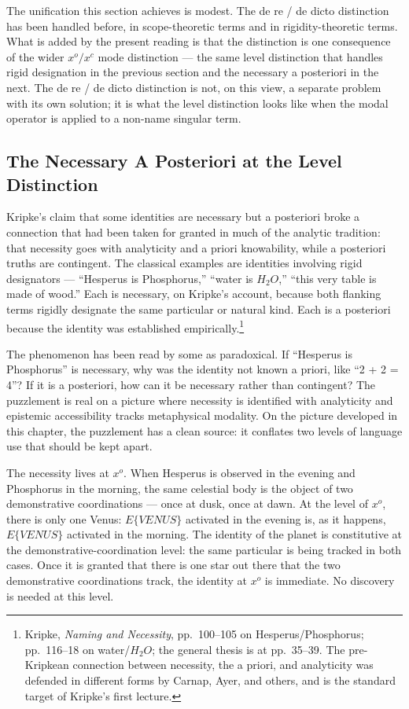 \documentclass[12pt,a4paper]{article}
\begin{document}
The unification this section achieves is modest. The de re / de dicto distinction has been handled before, in scope-theoretic terms and in rigidity-theoretic terms. What is added by the present reading is that the distinction is one consequence of the wider \(x^o/x^c\) mode distinction --- the same level distinction that handles rigid designation in the previous section and the necessary a posteriori in the next. The de re / de dicto distinction is not, on this view, a separate problem with its own solution; it is what the level distinction looks like when the modal operator is applied to a non-name singular term.

\subsection{The Necessary A Posteriori at the Level Distinction}\label{the-necessary-a-posteriori-at-the-level-distinction}

Kripke's claim that some identities are necessary but a posteriori broke a connection that had been taken for granted in much of the analytic tradition: that necessity goes with analyticity and a priori knowability, while a posteriori truths are contingent. The classical examples are identities involving rigid designators --- ``Hesperus is Phosphorus,'' ``water is \(H_2O\),'' ``this very table is made of wood.'' Each is necessary, on Kripke's account, because both flanking terms rigidly designate the same particular or natural kind. Each is a posteriori because the identity was established empirically.\footnote{Kripke, \emph{Naming and Necessity}, pp.~100--105 on Hesperus/Phosphorus; pp.~116--18 on water/\(H_2O\); the general thesis is at pp.~35--39. The pre-Kripkean connection between necessity, the a priori, and analyticity was defended in different forms by Carnap, Ayer, and others, and is the standard target of Kripke's first lecture.}

The phenomenon has been read by some as paradoxical. If ``Hesperus is Phosphorus'' is necessary, why was the identity not known a priori, like ``2 + 2 = 4''? If it is a posteriori, how can it be necessary rather than contingent? The puzzlement is real on a picture where necessity is identified with analyticity and epistemic accessibility tracks metaphysical modality. On the picture developed in this chapter, the puzzlement has a clean source: it conflates two levels of language use that should be kept apart.

The necessity lives at \(x^o\). When Hesperus is observed in the evening and Phosphorus in the morning, the same celestial body is the object of two demonstrative coordinations --- once at dusk, once at dawn. At the level of \(x^o\), there is only one Venus: \(E\{VENUS\}\) activated in the evening is, as it happens, \(E\{VENUS\}\) activated in the morning. The identity of the planet is constitutive at the demonstrative-coordination level: the same particular is being tracked in both cases. Once it is granted that there is one star out there that the two demonstrative coordinations track, the identity at \(x^o\) is immediate. No discovery is needed at this level.
\end{document}
